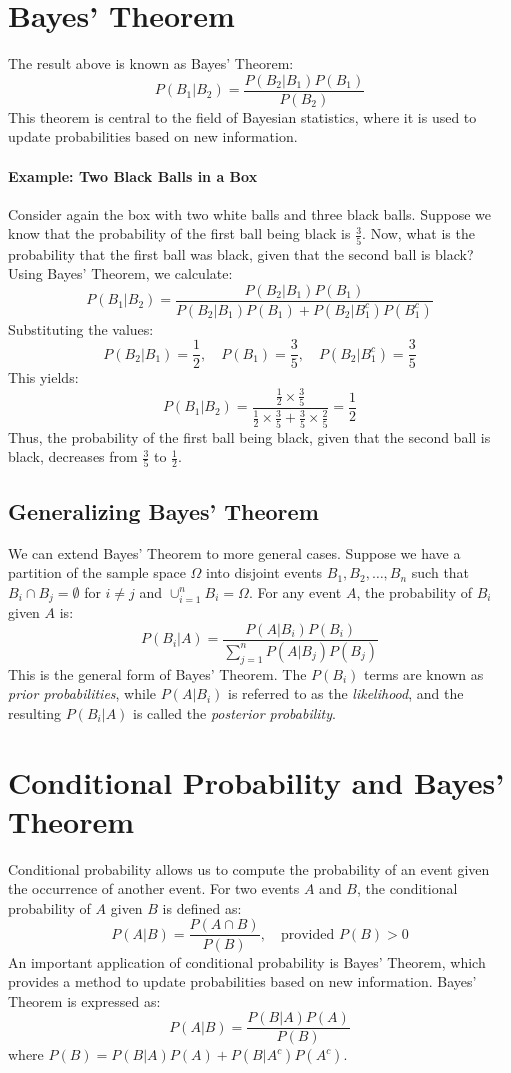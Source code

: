     \section{Bayes' Theorem}
    The result above is known as Bayes' Theorem:
    \[
    P(B_1 | B_2) = \frac{P(B_2 | B_1) P(B_1)}{P(B_2)}
    \]
    This theorem is central to the field of Bayesian statistics, where it is used to update probabilities based on new information. 
    
    \paragraph{Example: Two Black Balls in a Box}
    Consider again the box with two white balls and three black balls. Suppose we know that the probability of the first ball being black is \( \frac{3}{5} \). Now, what is the probability that the first ball was black, given that the second ball is black? Using Bayes' Theorem, we calculate:
    \[
    P(B_1 | B_2) = \frac{P(B_2 | B_1) P(B_1)}{P(B_2 | B_1) P(B_1) + P(B_2 | B_1^c) P(B_1^c)}
    \]
    Substituting the values:
    \[
    P(B_2 | B_1) = \frac{1}{2}, \quad P(B_1) = \frac{3}{5}, \quad P(B_2 | B_1^c) = \frac{3}{5}
    \]
    This yields:
    \[
    P(B_1 | B_2) = \frac{\frac{1}{2} \times \frac{3}{5}}{\frac{1}{2} \times \frac{3}{5} + \frac{3}{5} \times \frac{2}{5}} = \frac{1}{2}
    \]
    Thus, the probability of the first ball being black, given that the second ball is black, decreases from \( \frac{3}{5} \) to \( \frac{1}{2} \).
    
    \subsection{Generalizing Bayes' Theorem}
    We can extend Bayes' Theorem to more general cases. Suppose we have a partition of the sample space \( \Omega \) into disjoint events \( B_1, B_2, \dots, B_n \) such that \( B_i \cap B_j = \emptyset \) for \( i \neq j \) and \( \cup_{i=1}^n B_i = \Omega \). For any event \( A \), the probability of \( B_i \) given \( A \) is:
    \[
    P(B_i | A) = \frac{P(A | B_i) P(B_i)}{\sum_{j=1}^n P(A | B_j) P(B_j)}
    \]
    This is the general form of Bayes' Theorem. The \( P(B_i) \) terms are known as \emph{prior probabilities}, while \( P(A | B_i) \) is referred to as the \emph{likelihood}, and the resulting \( P(B_i | A) \) is called the \emph{posterior probability}.
    
    
    \section{Conditional Probability and Bayes' Theorem}
    Conditional probability allows us to compute the probability of an event given the occurrence of another event. For two events \( A \) and \( B \), the conditional probability of \( A \) given \( B \) is defined as:
    \[
    P(A | B) = \frac{P(A \cap B)}{P(B)}, \quad \text{provided } P(B) > 0
    \]
    An important application of conditional probability is Bayes' Theorem, which provides a method to update probabilities based on new information. Bayes' Theorem is expressed as:
    \[
    P(A | B) = \frac{P(B | A) P(A)}{P(B)}
    \]
    where \( P(B) = P(B | A) P(A) + P(B | A^c) P(A^c) \).
        
